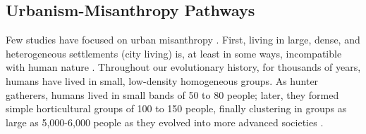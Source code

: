 \documentclass[11pt, letterpaper]{article}
\begin{document}
\begin{spacing}{1.4}




\subsection*{Urbanism-Misanthropy Pathways}

Few studies have focused on urban misanthropy 
\citep{thrift05,melgar13,keeling13,smith97,bloch87,wilson85,ray81,gibson17,rosenberg57,rosenberg56}.
First, living in large, dense, and heterogeneous settlements (city living) is, at least in some ways, incompatible with human nature \citep{haidt12B}. Throughout our evolutionary
history, for thousands of years, humans have lived in small, low-density
homogeneous groups. As hunter gatherers, humans lived in small bands of 50 to 80
people; later, they formed simple horticultural groups of 100 to 150 people,
finally clustering in groups as large as 5,000-6,000  people as they evolved
into more advanced societies \citep{maryanski92}.

\end{spacing}
\end{document}
